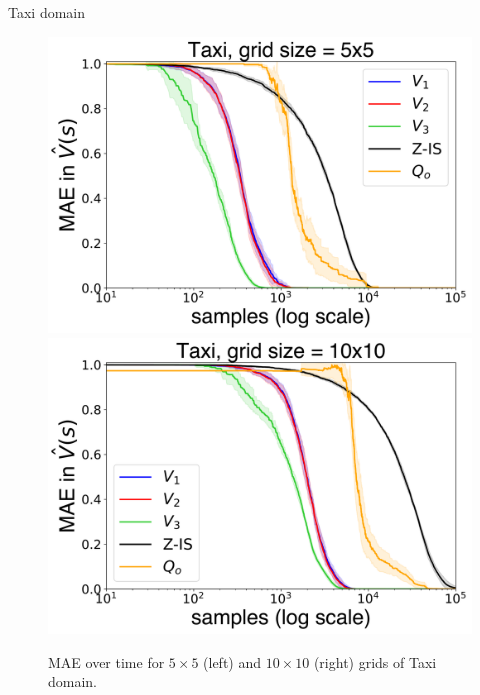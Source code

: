 \documentclass{beamer}
\theoremstyle{mystyle}
\begin{document}
%    
%    
%


\begin{frame}{Taxi domain}

\begin{figure}[H]
\centering
\includegraphics[scale=0.22]{Figures/taxi_5-1.png}
\includegraphics[scale=0.22]{Figures/taxi_10-1.png}
\caption{MAE over time for $5 \times 5$ (left) and $10 \times 10$ (right) grids of Taxi domain.}
\label{fig:errors_taxi}
\end{figure}

\end{frame}
\end{document}
